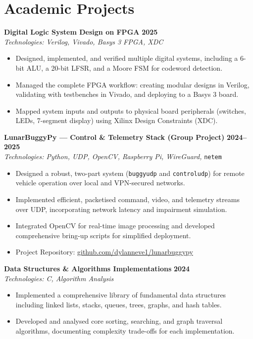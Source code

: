 \documentclass[10pt,a4paper]{article}
\begin{document}
\section*{Academic Projects}
\textbf{Digital Logic System Design on FPGA} \hfill \textbf{2025} \\
\textit{Technologies: Verilog, Vivado, Basys 3 FPGA, XDC}
\begin{itemize}
    \item Designed, implemented, and verified multiple digital systems, including a 6-bit ALU, a 20-bit LFSR, and a Moore FSM for codeword detection.
    \item Managed the complete FPGA workflow: creating modular designs in Verilog, validating with testbenches in Vivado, and deploying to a Basys 3 board.
    \item Mapped system inputs and outputs to physical board peripherals (switches, LEDs, 7-segment display) using Xilinx Design Constraints (XDC).
\end{itemize}
\medskip
\textbf{LunarBuggyPy --- Control \& Telemetry Stack (Group Project)} \hfill \textbf{2024--2025} \\
\textit{Technologies: Python, UDP, OpenCV, Raspberry Pi, WireGuard,} \texttt{netem}
\begin{itemize}
    \item Designed a robust, two-part system (\texttt{buggyudp} and \texttt{controludp}) for remote vehicle operation over local and VPN-secured networks.
    \item Implemented efficient, packetised command, video, and telemetry streams over UDP, incorporating network latency and impairment simulation.
    \item Integrated OpenCV for real-time image processing and developed comprehensive bring-up scripts for simplified deployment.
    \item Project Repository: \href{https://github.com/dylanneve1/lunarbuggypy}{github.com/dylanneve1/lunarbuggypy}
\end{itemize}
\medskip
\textbf{Data Structures \& Algorithms Implementations} \hfill \textbf{2024} \\
\textit{Technologies: C, Algorithm Analysis}
\begin{itemize}
    \item Implemented a comprehensive library of fundamental data structures including linked lists, stacks, queues, trees, graphs, and hash tables.
    \item Developed and analysed core sorting, searching, and graph traversal algorithms, documenting complexity trade-offs for each implementation.
\end{itemize}
\end{document}
